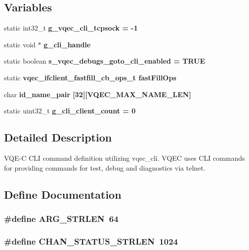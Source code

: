 \subsection*{Variables}
\begin{CompactItemize}
\item 
static int32\_\-t \bf{g\_\-vqec\_\-cli\_\-tcpsock} = -1
\item 
static void $\ast$ \bf{g\_\-cli\_\-handle}
\item 
static boolean \bf{s\_\-vqec\_\-debugs\_\-goto\_\-cli\_\-enabled} = \bf{TRUE}
\item 
static \bf{vqec\_\-ifclient\_\-fastfill\_\-cb\_\-ops\_\-t} \bf{fast\-Fill\-Ops}
\item 
char \bf{id\_\-name\_\-pair} [32][VQEC\_\-MAX\_\-NAME\_\-LEN]
\item 
static uint32\_\-t \bf{g\_\-cli\_\-client\_\-count} = 0
\end{CompactItemize}


\subsection{Detailed Description}
VQE-C CLI command definition utilizing vqec\_\-cli. VQEC uses CLI commands for providing commands for test, debug and diagnostics via telnet. 



\subsection{Define Documentation}
\subsubsection{\setlength{\rightskip}{0pt plus 5cm}\#define ARG\_\-STRLEN~64}\label{vqec__cli__register_8c_c70560c96c1f5c2dc3eecfe6a8634c2e}


\subsubsection{\setlength{\rightskip}{0pt plus 5cm}\#define CHAN\_\-STATUS\_\-STRLEN~1024}\label{vqec__cli__register_8c_5de53fb0f1b9c4c5e7fcb6fba093d44c}


